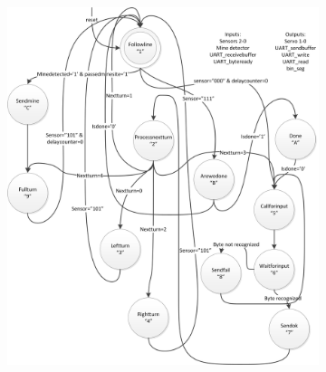 \documentclass{report}
\begin{document}
\begin{figure}
\begin{subfigure}{0.46\linewidth}
\includegraphics[width=\linewidth]{FSMMain}
\end{subfigure}
\quad
\begin{subfigure}{0.23\linewidth}
\label{fig:fsmSender}

\end{subfigure}
\end{figure}
\end{document}
